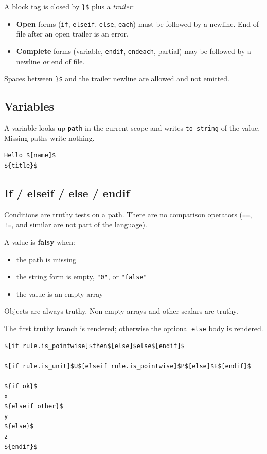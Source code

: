 \documentclass[11pt,letterpaper]{article}
\newcommand{\api}[1]{\texttt{#1}}
\begin{document}
A block tag is closed by \texttt{\}\$} plus a \emph{trailer}:

\begin{itemize}
  \item \textbf{Open} forms (\texttt{if}, \texttt{elseif}, \texttt{else},
        \texttt{each}) must be followed by a newline. End of file after an
        open trailer is an error.
  \item \textbf{Complete} forms (variable, \texttt{endif}, \texttt{endeach},
        partial) may be followed by a newline \emph{or} end of file.
\end{itemize}

Spaces between \texttt{\}\$} and the trailer newline are allowed and not
emitted.

\subsection{Variables}

A variable looks up \texttt{path} in the current scope and writes
\api{to\_string} of the value. Missing paths write nothing.

\begin{lstlisting}[style=tmpl]
Hello $[name]$
${title}$
\end{lstlisting}

\subsection{If / elseif / else / endif}

Conditions are truthy tests on a path. There are no comparison operators
(\texttt{==}, \texttt{!=}, and similar are not part of the language).

A value is \textbf{falsy} when:

\begin{itemize}[nosep]
  \item the path is missing
  \item the string form is empty, \texttt{"0"}, or \texttt{"false"}
  \item the value is an empty array
\end{itemize}

Objects are always truthy. Non-empty arrays and other scalars are truthy.

The first truthy branch is rendered; otherwise the optional \texttt{else}
body is rendered.

\begin{lstlisting}[style=tmpl]
$[if rule.is_pointwise]$then$[else]$else$[endif]$

$[if rule.is_unit]$U$[elseif rule.is_pointwise]$P$[else]$E$[endif]$

${if ok}$
x
${elseif other}$
y
${else}$
z
${endif}$
\end{lstlisting}
\end{document}
